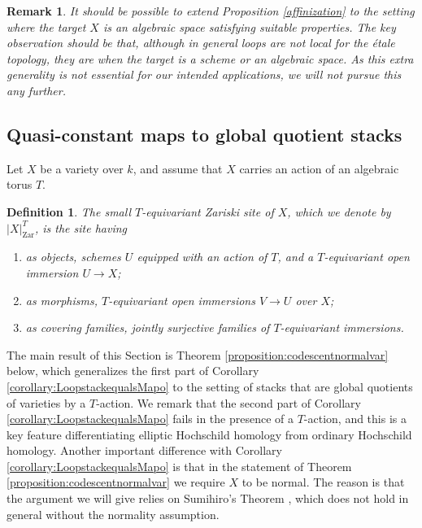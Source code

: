 \documentclass[11pt,letterpaper]{amsart}
\newtheorem{definition}[dummy]{Definition}
\newtheorem{remark}[dummy]{Remark}
\newcommand{\Zar}[1]{|#1|_{\mathrm{Zar}}}
\begin{document}
\begin{remark}
It should be possible to extend Proposition \ref{affinization}  to the setting where the target $X$ is an algebraic space satisfying suitable properties. The key observation should be that, although in general  loops are not local for the \'etale topology, they are when the target is a scheme or an algebraic space. As this extra generality is not essential for our intended applications, we will not pursue this  any further.
\end{remark}

\subsection{Quasi-constant maps to global quotient stacks}
\label{label:globalquotient}
Let $X$ be a variety over $k$, and assume that $X$ carries an action of an algebraic torus $T$.  
\begin{definition} The small \emph{$T$-equivariant Zariski site} of $X$, which we denote by   
$\Zar{X}^T$, is   the site having 
\begin{enumerate}
\item as objects, schemes $U$ equipped with an action of $T$, and a $T$-equivariant open immersion  $U \to X$;
\item as morphisms, $T$-equivariant open immersions $V \to U$ over $X$;
\item  as covering families, jointly surjective families of $T$-equivariant immersions.
\end{enumerate}
\end{definition}
The main result of this Section is Theorem \ref{proposition:codescentnormalvar} below, which generalizes the first part of Corollary \ref{corollary:LoopstackequalsMapo} to the setting of stacks that are global quotients of varieties by a $T$-action. We remark that the second part of Corollary \ref{corollary:LoopstackequalsMapo} fails in the presence of a $T$-action, and this is a key feature differentiating  elliptic Hochschild homology from ordinary Hochschild homology. Another important difference with Corollary \ref{corollary:LoopstackequalsMapo}  is that in the statement of Theorem \ref{proposition:codescentnormalvar} we require $X$ to be normal. The reason is that the argument we will give relies on Sumihiro's Theorem \cite{sumihiro1974equivariant}, which does not hold in general without the normality assumption. 
  
\end{document}
